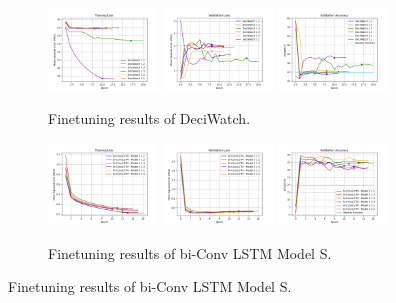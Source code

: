 \documentclass[./main.tex]{subfiles}
\begin{document}
\begin{figure}[htbp]
    \begin{subfigure}[b]{\textwidth}
        \centering
        \includegraphics[width=0.32\textwidth]{./entities/finetuned/deciwatch/train_losses.png}
        \includegraphics[width=0.32\textwidth]{./entities/finetuned/deciwatch/val_losses.png}
        \includegraphics[width=0.32\textwidth]{./entities/finetuned/deciwatch/val_accs.png}
        \caption{Finetuning results of DeciWatch.}
    \end{subfigure}
   \hfill

   \begin{subfigure}[b]{\textwidth}
    \centering
    \includegraphics[width=0.32\textwidth]{./entities/finetuned/unipose/train_losses.png}
    \includegraphics[width=0.32\textwidth]{./entities/finetuned/unipose/val_losses.png}
    \includegraphics[width=0.32\textwidth]{./entities/finetuned/unipose/val_accs.png}
    \caption{Finetuning results of bi-Conv LSTM Model S.}
    \end{subfigure}
    \hfill


\end{figure}
\end{document}
